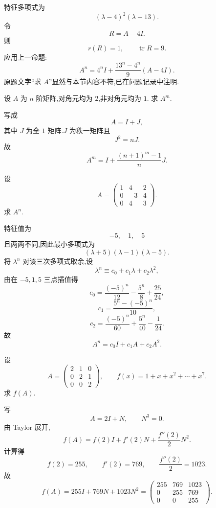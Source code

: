 \begin{solution}
特征多项式为
\[
(\lambda-4)^2(\lambda-13).
\]
令
\[
R=A-4I.
\]
则
\[
r(R)=1,\qquad \operatorname{tr}R=9.
\]
应用上一命题:
\[
\boxed{
A^n
=
4^nI
+
\dfrac{13^n-4^n}{9}(A-4I).
}
\]
原题文字``求 $A$''显然与本节内容不符,已在问题记录中注明.
\end{solution}


\begin{example}
设 $A$ 为 $n$ 阶矩阵,对角元均为 $2$,非对角元均为 $1$.
求 $A^m$.
\end{example}
\exampleblank

\begin{solution}
写成
\[
A=I+J,
\]
其中 $J$ 为全 $1$ 矩阵.$J$ 为秩一矩阵且
\[
J^2=nJ.
\]
故
\[
\boxed{
A^m
=
I+\dfrac{(n+1)^m-1}{n}J.
}
\]
\end{solution}


\begin{example}
设
\[
A=
\begin{pmatrix}
1&4&2\\
0&-3&4\\
0&4&3
\end{pmatrix}.
\]
求 $A^n$.
\end{example}
\exampleblank

\begin{solution}
特征值为
\[
-5,\quad1,\quad5
\]
且两两不同,因此最小多项式为
\[
(\lambda+5)(\lambda-1)(\lambda-5).
\]
将 $\lambda^n$ 对该三次多项式取余,设
\[
\lambda^n\equiv c_0+c_1\lambda+c_2\lambda^2,
\]
由在 $-5,1,5$ 三点插值得
\[
c_0=
\dfrac{(-5)^n}{12}
-\dfrac{5^n}{8}
+\dfrac{25}{24},
\]
\[
c_1=
\dfrac{5^n-(-5)^n}{10},
\]
\[
c_2=
\dfrac{(-5)^n}{60}
+\dfrac{5^n}{40}
-\dfrac1{24}.
\]
故
\[
\boxed{
A^n=c_0I+c_1A+c_2A^2.
}
\]
\end{solution}


\begin{example}
设
\[
A=
\begin{pmatrix}
2&1&0\\
0&2&1\\
0&0&2
\end{pmatrix},
\qquad
f(x)=1+x+x^2+\cdots+x^7.
\]
求 $f(A)$.
\end{example}
\exampleblank

\begin{solution}
写
\[
A=2I+N,
\qquad
N^3=0.
\]
由 Taylor 展开,
\[
f(A)=f(2)I+f'(2)N+\dfrac{f''(2)}{2}N^2.
\]
计算得
\[
f(2)=255,\qquad
f'(2)=769,\qquad
\dfrac{f''(2)}2=1023.
\]
故
\[
\boxed{
f(A)=
255I+769N+1023N^2
=
\begin{pmatrix}
255&769&1023\\
0&255&769\\
0&0&255
\end{pmatrix}.
}
\]
\end{solution}


